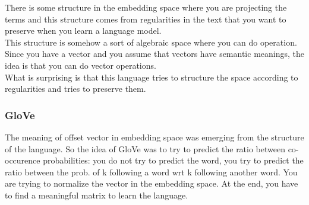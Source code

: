 

There is some structure in the embedding space where you are projecting the terms and this structure comes from regularities in the text that you want to preserve when you learn a language model. \\
This structure is somehow a sort of algebraic space where you can do operation. Since you have a vector and you assume that vectors have semantic meanings, the idea is that you can do vector operations. \\
What is surprising is that this language tries to structure the space according to regularities and tries to preserve them.  

\subsubsection{GloVe}
The meaning of offset vector in embedding space was emerging from the structure of the language. So the idea of GloVe was to try to predict the ratio between co-occurence probabilities: you do not try to predict the word, you try to predict the ratio between the prob. of k following a word wrt k following another word. You are trying to normalize the vector in the embedding space. At the end, you have to find a meaningful matrix to learn the language. \\

